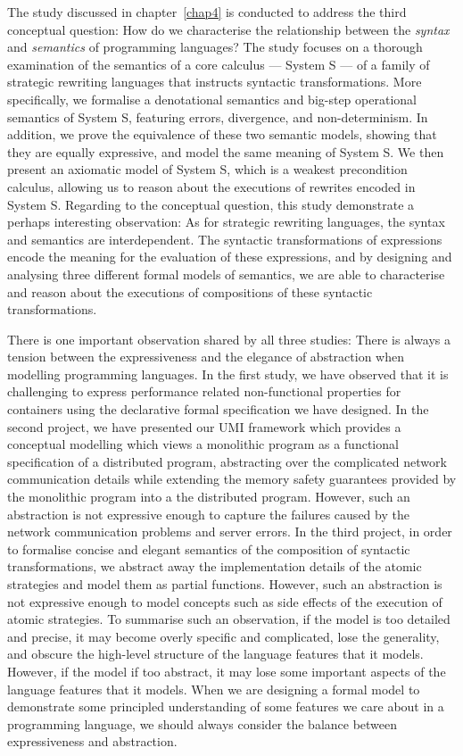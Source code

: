 The study discussed in chapter~\ref{chap4} is conducted to address the third conceptual question: How do we characterise the relationship between the \emph{syntax} and \emph{semantics} of programming languages? The study focuses on a thorough examination of the semantics of a core calculus --- System S --- of a family of strategic rewriting languages that instructs syntactic transformations. More specifically, we formalise a denotational semantics and big-step operational semantics of System S, featuring errors, divergence, and non-determinism. In addition, we prove the equivalence of these two semantic models, showing that they are equally expressive, and model the same meaning of System S. We then present an axiomatic model of System S, which is a weakest precondition calculus, allowing us to reason about the executions of rewrites encoded in System S. Regarding to the conceptual question, this study demonstrate a perhaps interesting observation: As for strategic rewriting languages, the syntax and semantics are interdependent. The syntactic transformations of expressions encode the meaning for the evaluation of these expressions, and by designing and analysing three different formal models of semantics, we are able to characterise and reason about the executions of compositions of these syntactic transformations.

There is one important observation shared by all three studies: There is always a tension between the expressiveness and the elegance of abstraction when modelling programming languages. In the first study, we have observed that it is challenging to express performance related non-functional properties for containers using the declarative formal specification we have designed. In the second project, we have presented our UMI framework which provides a conceptual modelling which views a monolithic program as a functional specification of a distributed program, abstracting over the complicated network communication details while extending the memory safety guarantees provided by the monolithic program into a the distributed program. However, such an abstraction is not expressive enough to capture the failures caused by the network communication problems and server errors. In the third project, in order to formalise concise and elegant semantics of the composition of syntactic transformations, we abstract away the implementation details of the atomic strategies and model them as partial functions. However, such an abstraction is not expressive enough to model concepts such as side effects of the execution of atomic strategies. To summarise such an observation, if the model is too detailed and precise, it may become overly specific and complicated, lose the generality, and obscure the high-level structure of the language features that it models. However, if the model if too abstract, it may lose some important aspects of the language features that it models. When we are designing a formal model to demonstrate some principled understanding of some features we care about in a programming language, we should always consider the balance between expressiveness and abstraction. 

